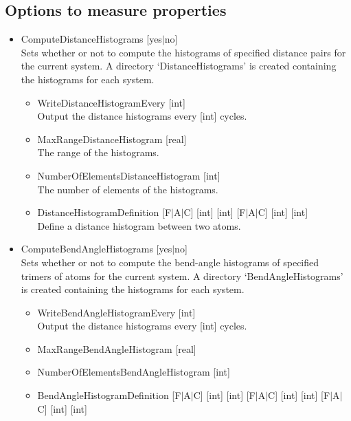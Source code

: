 \subsection*{Options to measure properties}
\begin{itemize}

\item{ComputeDistanceHistograms [yes$|$no]}\\
Sets whether or not to compute the histograms of specified distance pairs for the current system.
A directory `DistanceHistograms' is created containing the histograms for each system.
\begin{itemize}
\item{WriteDistanceHistogramEvery [int]}\\
Output the distance histograms every [int] cycles.
\item{MaxRangeDistanceHistogram [real]}\\
The range of the histograms.
\item{NumberOfElementsDistanceHistogram [int]}\\
The number of elements of the histograms.
\item{DistanceHistogramDefinition [F$|$A$|$C] [int] [int] [F$|$A$|$C] [int] [int]}\\
Define a distance histogram between two atoms.
\end{itemize}

\item{ComputeBendAngleHistograms [yes$|$no]}\\
Sets whether or not to compute the bend-angle histograms of specified trimers of atoms for the current system.
A directory `BendAngleHistograms' is created containing the histograms for each system.
\begin{itemize}
\item{WriteBendAngleHistogramEvery [int]}\\
Output the distance histograms every [int] cycles.
\item{MaxRangeBendAngleHistogram [real]}\\
\item{NumberOfElementsBendAngleHistogram [int]}\\
\item{BendAngleHistogramDefinition [F$|$A$|$C] [int] [int] [F$|$A$|$C] [int] [int] [F$|$A$|$C] [int] [int]}\\
\end{itemize}


\end{itemize}
